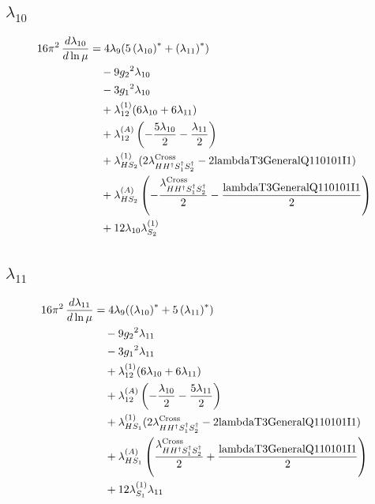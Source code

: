 \documentclass[10pt,a4paper]{article}
\begin{document}
\subsection*{$\lambda_{10}$}
\begin{align*}
16\pi^2\,\frac{d \lambda_{10}}{d\ln\mu} &=4 {\lambda_{9}} (5 \left({\lambda_{10}}\right)^{*}+\left({\lambda_{11}}\right)^{*}) \\
&\quad -9 {g_2}^2 {\lambda_{10}} \\
&\quad -3 {g_1}^2 {\lambda_{10}} \\
&\quad +{\lambda_{12}^{(1)}} (6 {\lambda_{10}}+6 {\lambda_{11}}) \\
&\quad +{\lambda_{12}^{(A)}} \left(-\frac{5 {\lambda_{10}}}{2}-\frac{{\lambda_{11}}}{2}\right) \\
&\quad +{\lambda_{HS_2}^{(1)}} (2 {\lambda_{H H^\dagger S_1^\dagger S_2^\dagger}^{\rm Cross}}-2 \text{lambdaT3GeneralQ110101I1}) \\
&\quad +{\lambda_{HS_2}^{(A)}} \left(-\frac{{\lambda_{H H^\dagger S_1^\dagger S_2^\dagger}^{\rm Cross}}}{2}-\frac{\text{lambdaT3GeneralQ110101I1}}{2}\right) \\
&\quad +12 {\lambda_{10}} {\lambda_{S_2}^{(1)}} \\
\end{align*}
\subsection*{$\lambda_{11}$}
\begin{align*}
16\pi^2\,\frac{d \lambda_{11}}{d\ln\mu} &=4 {\lambda_{9}} (\left({\lambda_{10}}\right)^{*}+5 \left({\lambda_{11}}\right)^{*}) \\
&\quad -9 {g_2}^2 {\lambda_{11}} \\
&\quad -3 {g_1}^2 {\lambda_{11}} \\
&\quad +{\lambda_{12}^{(1)}} (6 {\lambda_{10}}+6 {\lambda_{11}}) \\
&\quad +{\lambda_{12}^{(A)}} \left(-\frac{{\lambda_{10}}}{2}-\frac{5 {\lambda_{11}}}{2}\right) \\
&\quad +{\lambda_{HS_1}^{(1)}} (2 {\lambda_{H H^\dagger S_1^\dagger S_2^\dagger}^{\rm Cross}}-2 \text{lambdaT3GeneralQ110101I1}) \\
&\quad +{\lambda_{HS_1}^{(A)}} \left(\frac{{\lambda_{H H^\dagger S_1^\dagger S_2^\dagger}^{\rm Cross}}}{2}+\frac{\text{lambdaT3GeneralQ110101I1}}{2}\right) \\
&\quad +12 {\lambda_{S_1}^{(1)}} {\lambda_{11}} \\
\end{align*}
\end{document}
